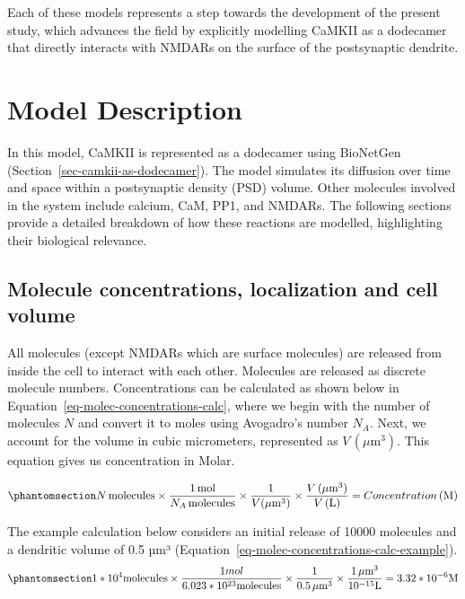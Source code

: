 \documentclass[
  11pt,
  letterpaper,
]{scrreprt}
\begin{document}
Each of these models represents a step towards the development of the
present study, which advances the field by explicitly modelling CaMKII
as a dodecamer that directly interacts with NMDARs on the surface of the
postsynaptic dendrite.

\section{Model Description}\label{model-description}

In this model, CaMKII is represented as a dodecamer using BioNetGen
(Section~\ref{sec-camkii-as-dodecamer}). The model simulates its
diffusion over time and space within a postsynaptic density (PSD)
volume. Other molecules involved in the system include calcium, CaM,
PP1, and NMDARs. The following sections provide a detailed breakdown of
how these reactions are modelled, highlighting their biological
relevance.

\subsection{Molecule concentrations, localization and cell
volume}\label{molecule-concentrations-localization-and-cell-volume}

All molecules (except NMDARs which are surface molecules) are released
from inside the cell to interact with each other. Molecules are released
as discrete molecule numbers. Concentrations can be calculated as shown
below in Equation~\ref{eq-molec-concentrations-calc}, where we begin
with the number of molecules \(N\) and convert it to moles using
Avogadro's number \(N_A\). Next, we account for the volume in cubic
micrometers, represented as \(V \, (\mu \text{m}^3)\). This equation
gives us concentration in Molar.

\begin{equation}\phantomsection\label{eq-molec-concentrations-calc}{
N \, \text{molecules} \times 
\frac{1 \, \text{mol}}{N_A \, \text{molecules}} \times 
\frac{1}{V(\mu \text{m}^3)} \times 
\frac{V \, (\mu \text{m}^3)}{V \, (\text{L})} = 
Concentration \, (\text{M})
}\end{equation}

The example calculation below considers an initial release of 10000
molecules and a dendritic volume of 0.5 µm³
(Equation~\ref{eq-molec-concentrations-calc-example}).
\begin{equation}\phantomsection\label{eq-molec-concentrations-calc-example}{
1*10^{4} \text{molecules} \times 
\frac{1 mol}{6.023*10^{23} \text{molecules}} \times 
\frac{1}{0.5 \, \mu \text{m}^3} \times 
\frac{1  \, \mu \text{m}^3}{10 ^{-15} \text{L}} =
3.32*10^{-6} \text{M}
}\end{equation}
\end{document}
